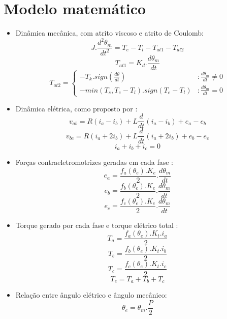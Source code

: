     \section{Modelo matemático}
    \label{sec:modelo_matematico}
        \begin{itemize}
            \item Dinâmica mecânica, com atrito viscoso e atrito de Coulomb:
                $$J.\frac{d^2\theta_m}{dt^2}=T_e-T_l-T_{at1}-T_{at2}$$
                $$T_{at1} = K_d.\frac{d\theta_m}{dt}$$
                 \begin{displaymath}
                   T_{at2} = \left\{
                     \begin{array}{lr}
                       -T_k.sign(\frac{d\theta}{dt}) & : \frac{d\theta_m}{dt} \neq 0\\
                       -min(T_s,T_e-T_l).sign(T_e-T_l) & : \frac{d\theta_m}{dt} = 0
                     \end{array}
                   \right.
                \end{displaymath}
            \item Dinâmica elétrica, como proposto por \cite{baldursson}:
                $$v_{ab} = R(i_a-i_b)+L\frac{d}{dt}(i_a-i_b)+e_a-e_b$$
                $$v_{bc} = R(i_a+2i_b)+L\frac{d}{dt}(i_a+2i_b)+e_b-e_c$$
                $$i_a+i_b+i_c=0$$
            \item Forças contraeletromotrizes geradas em cada fase \cite{baldursson}:
                $$e_a = \frac{f_a(\theta_e).K_e}{2}.\frac{d\theta_m}{dt} $$
                $$e_b = \frac{f_b(\theta_e).K_e}{2}.\frac{d\theta_m}{dt} $$
                $$e_c = \frac{f_c(\theta_e).K_e}{2}.\frac{d\theta_m}{dt} $$
            \item Torque gerado por cada fase e torque elétrico total \cite{baldursson}:
                $$T_a=\frac{f_a(\theta_e).K_t.i_a}{2}$$
                $$T_b=\frac{f_b(\theta_e).K_t.i_b}{2}$$
                $$T_c=\frac{f_c(\theta_e).K_t.i_c}{2}$$
                $$T_e=T_a+T_b+T_c$$
            \item Relação entre ângulo elétrico e ângulo mecânico:
                $$\theta_e=\theta_m.\frac{P}{2}$$
        \end{itemize}

